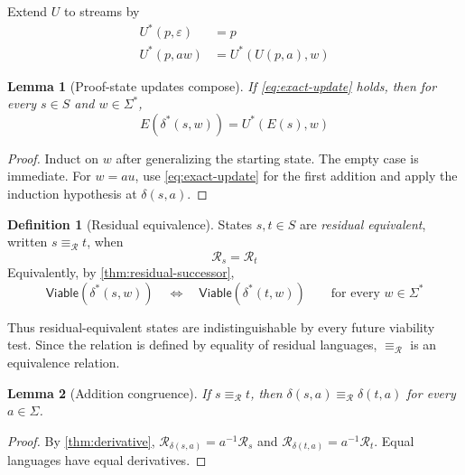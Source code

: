 \documentclass[11pt]{article}
\newtheorem{lemma}[lemma]{Lemma}
\theoremstyle{definition}
\newtheorem{definition}[definition]{Definition}
\newcommand{\States}{S}
\newcommand{\Additions}{\Sigma}
\newcommand{\Run}{\delta^{*}}
\newcommand{\Viable}{\mathsf{Viable}}
\newcommand{\Residual}{\mathcal R}
\newcommand{\Encode}{E}
\newcommand{\Update}{U}
\newcommand{\ResidualEq}{\equiv_{\Residual}}
\newcommand{\eps}{\varepsilon}
\begin{document}
Extend $\Update$ to streams by
\begin{equation}\label{eq:update-many}
\begin{aligned}
  \Update^*(p,\eps)&=p\\
  \Update^*(p,aw)&=\Update^*(\Update(p,a),w)
\end{aligned}
\end{equation}

\begin{lemma}[Proof-state updates compose]\label{lem:update-compose}
If \eqref{eq:exact-update} holds, then for every $s\in\States$ and
$w\in\Additions^*$,
\begin{equation}\label{eq:update-compose}
  \Encode(\Run(s,w))=\Update^*(\Encode(s),w)
\end{equation}
\end{lemma}

\begin{proof}
Induct on $w$ after generalizing the starting state. The empty case is immediate. For $w=au$, use
\eqref{eq:exact-update} for the first addition and apply the induction hypothesis at $\delta(s,a)$.
\end{proof}

\begin{definition}[Residual equivalence]\label{def:residual-equivalence}
States $s,t\in\States$ are \emph{residual equivalent}, written
$s\ResidualEq t$, when
\begin{equation}\label{eq:residual-equivalence}
  \Residual_s=\Residual_t
\end{equation}
Equivalently, by \cref{thm:residual-successor},
\[
  \Viable(\Run(s,w))
  \quad\Longleftrightarrow\quad
  \Viable(\Run(t,w))
  \qquad\text{for every }w\in\Additions^*
\]
\end{definition}

Thus residual-equivalent states are indistinguishable by every future
viability test. Since the relation is defined by equality of residual languages, $\ResidualEq$ is an equivalence relation.

\begin{lemma}[Addition congruence]\label{lem:residual-congruence}
If $s\ResidualEq t$, then
$\delta(s,a)\ResidualEq\delta(t,a)$ for every $a\in\Additions$.
\end{lemma}

\begin{proof}
By \cref{thm:derivative},
$\Residual_{\delta(s,a)}=a^{-1}\Residual_s$ and
$\Residual_{\delta(t,a)}=a^{-1}\Residual_t$.
Equal languages have equal derivatives.
\end{proof}
\end{document}

